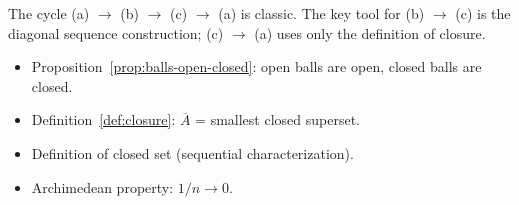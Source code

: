 \begin{remark*}
The cycle (a) $\to$ (b) $\to$ (c) $\to$ (a) is classic.
The key tool for (b) $\to$ (c) is the diagonal sequence construction;
(c) $\to$ (a) uses only the definition of closure.
\end{remark*}

\begin{remark*}[Dependencies]
\begin{itemize}
  \item Proposition~\ref{prop:balls-open-closed}: open balls are open, closed balls are closed.
  \item Definition~\ref{def:closure}: $\overline{A}$ = smallest closed superset.
  \item Definition of closed set (sequential characterization).
  \item Archimedean property: $1/n \to 0$.
\end{itemize}
\end{remark*}
